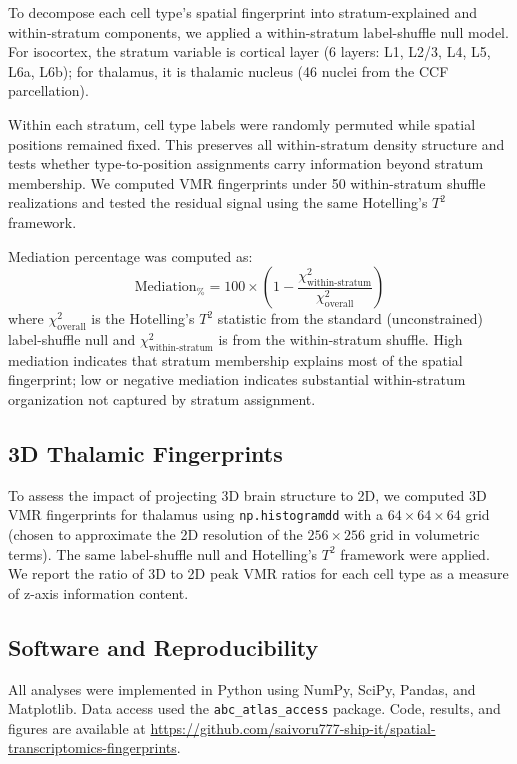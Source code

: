 \documentclass[11pt,a4paper]{article}
\begin{document}
To decompose each cell type's spatial fingerprint into stratum-explained and
within-stratum components, we applied a within-stratum label-shuffle null model.
For isocortex, the stratum variable is cortical layer (6 layers: L1, L2/3, L4,
L5, L6a, L6b); for thalamus, it is thalamic nucleus (46 nuclei from the CCF
parcellation).

Within each stratum, cell type labels were randomly permuted while spatial
positions remained fixed. This preserves all within-stratum density structure and
tests whether type-to-position assignments carry information beyond stratum
membership. We computed VMR fingerprints under 50 within-stratum shuffle
realizations and tested the residual signal using the same Hotelling's $T^2$
framework.

Mediation percentage was computed as:
\begin{equation}
  \text{Mediation}_\% = 100 \times \left(1 - \frac{\chi^2_\text{within-stratum}}{\chi^2_\text{overall}}\right)
\end{equation}
where $\chi^2_\text{overall}$ is the Hotelling's $T^2$ statistic from the
standard (unconstrained) label-shuffle null and $\chi^2_\text{within-stratum}$
is from the within-stratum shuffle. High mediation indicates that stratum
membership explains most of the spatial fingerprint; low or negative mediation
indicates substantial within-stratum organization not captured by stratum
assignment.

\subsection{3D Thalamic Fingerprints}
\label{sec:3d}

To assess the impact of projecting 3D brain structure to 2D, we computed 3D VMR
fingerprints for thalamus using \texttt{np.histogramdd} with a $64 \times 64
\times 64$ grid (chosen to approximate the 2D resolution of the $256 \times 256$
grid in volumetric terms). The same label-shuffle null and Hotelling's $T^2$
framework were applied. We report the ratio of 3D to 2D peak VMR ratios for each
cell type as a measure of z-axis information content.

\subsection{Software and Reproducibility}

All analyses were implemented in Python using NumPy, SciPy, Pandas, and
Matplotlib. Data access used the \texttt{abc\_atlas\_access} package. Code,
results, and figures are available at
\url{https://github.com/saivoru777-ship-it/spatial-transcriptomics-fingerprints}.
\end{document}

